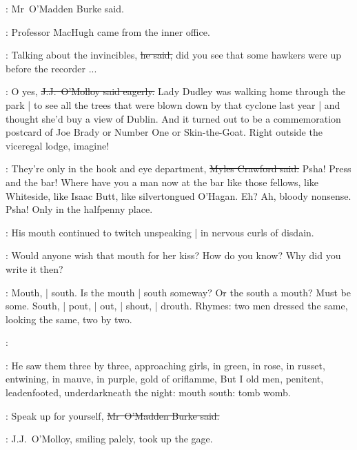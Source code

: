 :
Mr~O'Madden Burke said.

:
Professor MacHugh came from the inner office.

\machugh:
Talking about the invincibles,
\sout{he said,}
did you see that some hawkers were up before the recorder ...

\jjom:
O yes,
\sout{J.J.~O'Molloy said eagerly.}
Lady Dudley was walking home through the park |
to see all the trees that were blown down by that cyclone last year |
and thought she'd buy a view of Dublin.
And it turned out to be a commemoration postcard
of Joe Brady or Number One or Skin-the-Goat.
Right outside the viceregal lodge,
imagine!

\crawford:
They're only in the hook and eye department,
\sout{Myles Crawford said.}
Psha!
Press and the bar!
Where have you a man now at the bar like those fellows,
like Whiteside,
like Isaac Butt,
like silvertongued O'Hagan.
Eh?
Ah, bloody nonsense.
Psha!
Only in the halfpenny place.

:
His mouth continued to twitch unspeaking |
in nervous curls of disdain.%

\StephenInt:
Would anyone wish that mouth for her kiss?
How do you know?
Why did you write it then?



\StephenInt:
Mouth, |
south.
Is the mouth |
south someway?
Or the south a mouth?
Must be some.
South, |
pout, |
out, |
shout, |
drouth.
Rhymes:
two men dressed the same,
looking the same,
two by two.

\StephenInt:

\StephenInt:
He saw them three by three,
approaching girls,
in green,
in rose,
in russet,
entwining,
in mauve,
in purple,
gold of oriflamme,
But I old men,
penitent,
leadenfooted,
underdarkneath the night:
mouth south:
tomb womb.

\omaddenburke:
Speak up for yourself,
\sout{Mr~O'Madden Burke said.}



:
J.J.~O'Molloy,
smiling palely,
took up the gage.

